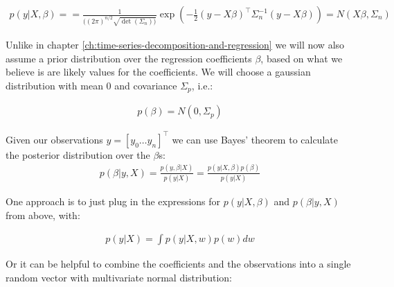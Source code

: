 \begin{gather*}
    p(y|X,\beta) =
    = \frac{1}{( (2\pi)^{n/2} \sqrt {\det(\Sigma_n))}}
    \exp(-\frac{1}{2}(y − X\beta)^{\top} \Sigma_n^{-1}(y - X\beta))
    = N(X \beta, \Sigma_n)
\end{gather*}

Unlike in chapter \ref{ch:time-series-decomposition-and-regression} we will now also
assume a prior distribution over the regression coefficients $\beta$, based on
what we believe is are likely values for the coefficients. We will choose a gaussian
distribution with mean $0$ and covariance $\Sigma_p$, i.e.:

\begin{gather*}
    p(\beta) = N(0, \Sigma_p)
\end{gather*}

Given our observations $y = [y_0 \dots y_n]^{\top}$  we can use Bayes' theorem to calculate the posterior distribution over the $\beta$s:
\begin{gather*}
    p(\beta|y, X) = \frac{p(y,\beta|X)}{p(y|X)} = \frac{p(y|X,\beta)p(\beta)}{p(y|X)}
\end{gather*}

One approach is to just plug in the expressions for $p(y|X,\beta)$ and $p(\beta|y, X)$ from above, with:

\begin{gather*}
    p(y|X) = \int p(y|X,w) p(w) dw
\end{gather*}

Or it can be helpful to combine the coefficients and the observations into a single random vector with
multivariate normal distribution:

